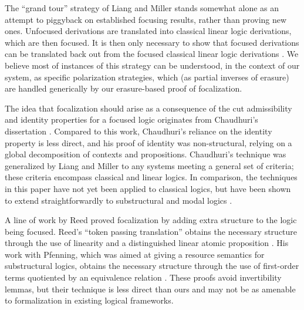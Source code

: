 \documentclass[acmtocl]{robtrans}\pdfoutput=1
\begin{document}
The ``grand tour'' strategy of Liang and Miller stands somewhat alone
as an attempt to piggyback on established focusing results, rather
than proving new ones.  Unfocused derivations are translated into
classical linear logic derivations, which are then focused. It is then
only necessary to show that focused derivations can be translated back
out from the focused classical linear logic derivations
\cite{liang09focusing}.  We believe most of instances of this strategy
can be understood, in the context of our system, as specific
polarization strategies, which (as partial inverses of erasure) are
handled generically by our erasure-based proof of focalization.
 





The idea that focalization should arise as a consequence of the 
cut admissibility
and identity properties for a focused logic
originates from Chaudhuri's dissertation
\cite{chaudhuri06focused}. Compared to this work, Chaudhuri's reliance on 
the identity property is less direct, and his proof of identity was 
non-structural, relying on a global decomposition of contexts and
propositions. Chaudhuri's technique was generalized by 
Liang and Miller  to any systems meeting 
a general set of criteria; 
these criteria encompass classical and linear logics. In comparison,
the techniques in this paper have not
yet been applied to classical logics,
but have been shown to extend straightforwardly to substructural 
and modal logics \cite{simmons12substructural}.

A line of work by Reed proved focalization by adding extra structure
to the logic being focused. Reed's ``token passing translation''
obtains the necessary structure through the use of linearity and a
distinguished linear atomic proposition \cite{reed08focalizing}. His
work with Pfenning, which was aimed at giving a resource semantics for
substructural logics, obtains the necessary structure through the use
of first-order terms quotiented by an equivalence relation
\cite{reed10focus}. These proofs avoid invertibility lemmas, but their
technique is less direct than ours and may not be as amenable to
formalization in existing logical frameworks.
\end{document}
